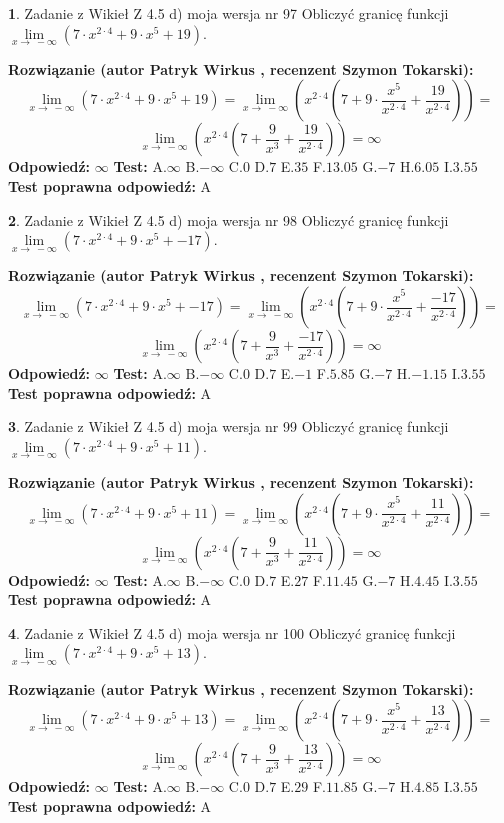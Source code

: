 \documentclass[12pt, a4paper]{article}
\theoremstyle{definition} %
\newtheorem{zad}{}
\newcommand{\zadStart}[1]{\begin{zad}#1\newline}
\newcommand{\zadStop}{\end{zad}}
\newcommand{\rozwStart}[2]{\noindent \textbf{Rozwiązanie (autor #1 , recenzent #2): }\newline}
\newcommand{\rozwStop}{\newline}
\newcommand{\odpStart}{\noindent \textbf{Odpowiedź:}\newline}
\newcommand{\odpStop}{\newline}
\newcommand{\testStart}{\noindent \textbf{Test:}\newline}
\newcommand{\testStop}{\newline}
\newcommand{\kluczStart}{\noindent \textbf{Test poprawna odpowiedź:}\newline}
\newcommand{\kluczStop}{\newline}
\begin{document}
\zadStart{Zadanie z Wikieł Z 4.5 d) moja wersja nr 97}
Obliczyć granicę funkcji  $\lim\limits_{x\to\ -\infty}(7 \cdot x^{2\cdot4}+9 \cdot x^{5}+19)$.
\zadStop
\rozwStart{Patryk Wirkus}{Szymon Tokarski}
$$\lim\limits_{x\to\ -\infty}(7 \cdot x^{2\cdot4}+9 \cdot x^{5}+19) = \lim\limits_{x\to\ -\infty}(x^{2\cdot4}(7 +9 \cdot \frac{x^{5}}{x^{2\cdot4}}+\frac{19}{x^{2\cdot4}})) =$$ $$\lim\limits_{x\to\ -\infty}(x^{2\cdot4}(7 +\frac{9}{x^{3}}+\frac{19}{x^{2\cdot4}})) =\infty$$
\rozwStop
\odpStart
$\infty$
\odpStop
\testStart
A.$\infty$ B.$-\infty$ C.$0$ D.$7$ E.$35$
F.$13.05$ G.$-7$
H.$6.05$
I.$3.55$
\testStop
\kluczStart
A
\kluczStop



\zadStart{Zadanie z Wikieł Z 4.5 d) moja wersja nr 98}
Obliczyć granicę funkcji  $\lim\limits_{x\to\ -\infty}(7 \cdot x^{2\cdot4}+9 \cdot x^{5}+-17)$.
\zadStop
\rozwStart{Patryk Wirkus}{Szymon Tokarski}
$$\lim\limits_{x\to\ -\infty}(7 \cdot x^{2\cdot4}+9 \cdot x^{5}+-17) = \lim\limits_{x\to\ -\infty}(x^{2\cdot4}(7 +9 \cdot \frac{x^{5}}{x^{2\cdot4}}+\frac{-17}{x^{2\cdot4}})) =$$ $$\lim\limits_{x\to\ -\infty}(x^{2\cdot4}(7 +\frac{9}{x^{3}}+\frac{-17}{x^{2\cdot4}})) =\infty$$
\rozwStop
\odpStart
$\infty$
\odpStop
\testStart
A.$\infty$ B.$-\infty$ C.$0$ D.$7$ E.$-1$
F.$5.85$ G.$-7$
H.$-1.15$
I.$3.55$
\testStop
\kluczStart
A
\kluczStop



\zadStart{Zadanie z Wikieł Z 4.5 d) moja wersja nr 99}
Obliczyć granicę funkcji  $\lim\limits_{x\to\ -\infty}(7 \cdot x^{2\cdot4}+9 \cdot x^{5}+11)$.
\zadStop
\rozwStart{Patryk Wirkus}{Szymon Tokarski}
$$\lim\limits_{x\to\ -\infty}(7 \cdot x^{2\cdot4}+9 \cdot x^{5}+11) = \lim\limits_{x\to\ -\infty}(x^{2\cdot4}(7 +9 \cdot \frac{x^{5}}{x^{2\cdot4}}+\frac{11}{x^{2\cdot4}})) =$$ $$\lim\limits_{x\to\ -\infty}(x^{2\cdot4}(7 +\frac{9}{x^{3}}+\frac{11}{x^{2\cdot4}})) =\infty$$
\rozwStop
\odpStart
$\infty$
\odpStop
\testStart
A.$\infty$ B.$-\infty$ C.$0$ D.$7$ E.$27$
F.$11.45$ G.$-7$
H.$4.45$
I.$3.55$
\testStop
\kluczStart
A
\kluczStop



\zadStart{Zadanie z Wikieł Z 4.5 d) moja wersja nr 100}
Obliczyć granicę funkcji  $\lim\limits_{x\to\ -\infty}(7 \cdot x^{2\cdot4}+9 \cdot x^{5}+13)$.
\zadStop
\rozwStart{Patryk Wirkus}{Szymon Tokarski}
$$\lim\limits_{x\to\ -\infty}(7 \cdot x^{2\cdot4}+9 \cdot x^{5}+13) = \lim\limits_{x\to\ -\infty}(x^{2\cdot4}(7 +9 \cdot \frac{x^{5}}{x^{2\cdot4}}+\frac{13}{x^{2\cdot4}})) =$$ $$\lim\limits_{x\to\ -\infty}(x^{2\cdot4}(7 +\frac{9}{x^{3}}+\frac{13}{x^{2\cdot4}})) =\infty$$
\rozwStop
\odpStart
$\infty$
\odpStop
\testStart
A.$\infty$ B.$-\infty$ C.$0$ D.$7$ E.$29$
F.$11.85$ G.$-7$
H.$4.85$
I.$3.55$
\testStop
\kluczStart
A
\kluczStop
\end{document}
